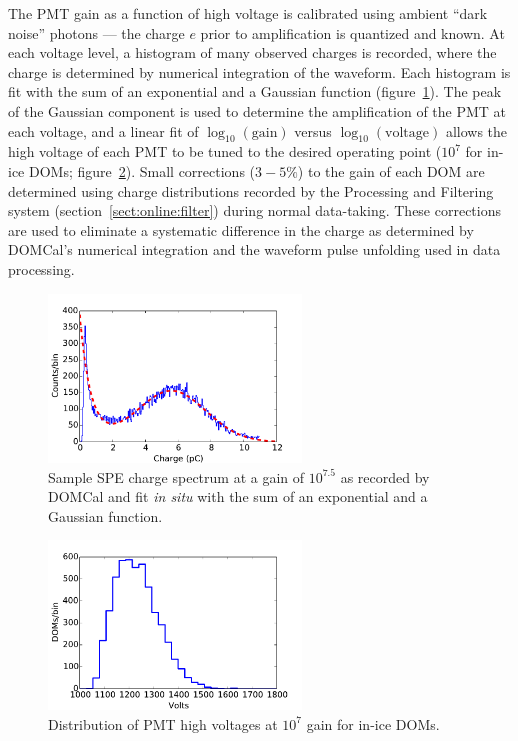 The PMT gain as a function of high voltage is calibrated using ambient
``dark noise'' photons --- the charge $e$ prior to amplification is quantized
and known.  At each voltage level, a histogram of many observed charges is
recorded, where the charge is determined by numerical integration of the waveform.
Each histogram is fit with the sum of an exponential and a Gaussian
function (figure~\ref{fig:domcal_hvfit}).  The peak of the Gaussian component is used
to 
determine the amplification of the PMT at each voltage, and a linear fit
of $\log_{10}(\mathrm{gain})$ versus $\log_{10}(\mathrm{voltage})$ allows
the high voltage of each PMT to be tuned to the desired operating point ($10^7$
for in-ice DOMs; figure~\ref{fig:domcal_hv_settings}).  Small 
corrections ($3-5\%$) to the gain of each DOM are determined using charge
distributions recorded by the Processing and Filtering system
(section~\ref{sect:online:filter}) during normal data-taking.  These
corrections are used to eliminate a systematic difference in the charge as
determined by DOMCal's numerical integration and the waveform pulse
unfolding used in data processing. 

\begin{figure}[!h]
 \centering
 \includegraphics[width=0.6\textwidth]{graphics/dom/domcal/hvfit.pdf}
 \caption{Sample SPE charge spectrum at a gain of $10^{7.5}$ as recorded by DOMCal and fit
   \textit{in situ} with the sum of an exponential and a Gaussian function.}
 \label{fig:domcal_hvfit}
\end{figure}

\begin{figure}[!h]
 \centering
 \includegraphics[width=0.6\textwidth]{graphics/dom/domcal/inice_hv_2016.pdf}
 \caption{Distribution of PMT high voltages at $10^7$ gain for in-ice DOMs.}
 \label{fig:domcal_hv_settings}
\end{figure}

